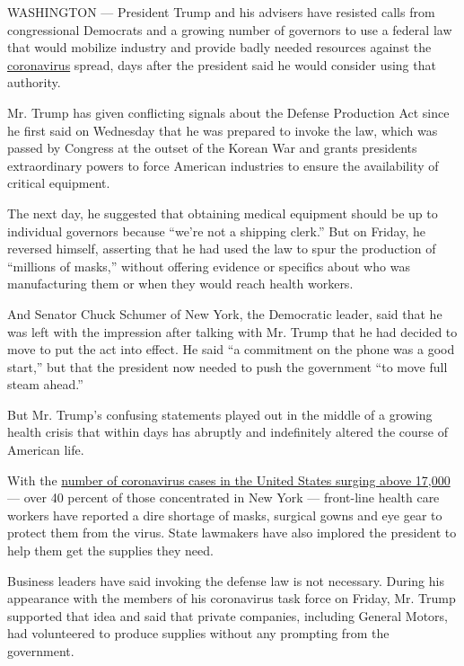 WASHINGTON --- President Trump and his advisers have resisted calls from
congressional Democrats and a growing number of governors to use a
federal law that would mobilize industry and provide badly needed
resources against the
\href{https://www.nytimes3xbfgragh.onion/2020/03/20/world/coronavirus-news.html}{coronavirus}
spread, days after the president said he would consider using that
authority.

Mr. Trump has given conflicting signals about the Defense Production Act
since he first said on Wednesday that he was prepared to invoke the law,
which was passed by Congress at the outset of the Korean War and grants
presidents extraordinary powers to force American industries to ensure
the availability of critical equipment.

The next day, he suggested that obtaining medical equipment should be up
to individual governors because ``we're not a shipping clerk.'' But on
Friday, he reversed himself, asserting that he had used the law to spur
the production of ``millions of masks,'' without offering evidence or
specifics about who was manufacturing them or when they would reach
health workers.

And Senator Chuck Schumer of New York, the Democratic leader, said that
he was left with the impression after talking with Mr. Trump that he had
decided to move to put the act into effect. He said ``a commitment on
the phone was a good start,'' but that the president now needed to push
the government ``to move full steam ahead.''

But Mr. Trump's confusing statements played out in the middle of a
growing health crisis that within days has abruptly and indefinitely
altered the course of American life.

With the
\href{https://www.nytimes3xbfgragh.onion/interactive/2020/world/coronavirus-maps.html\#us}{number
of coronavirus cases in the United States surging above 17,000} --- over
40 percent of those concentrated in New York --- front-line health care
workers have reported a dire shortage of masks, surgical gowns and eye
gear to protect them from the virus. State lawmakers have also implored
the president to help them get the supplies they need.

Business leaders have said invoking the defense law is not necessary.
During his appearance with the members of his coronavirus task force on
Friday, Mr. Trump supported that idea and said that private companies,
including General Motors, had volunteered to produce supplies without
any prompting from the government.

